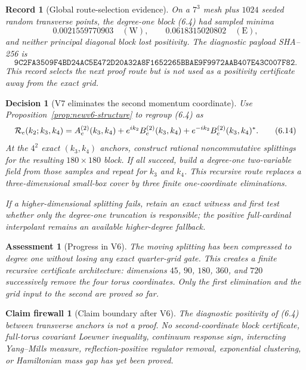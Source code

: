 \documentclass[11pt,oneside]{article}
\newtheorem{assessment}[theorem]{Assessment}
\newtheorem{firewall}[theorem]{Claim firewall}
\newtheorem{record}[theorem]{Record}
\newtheorem{decision}[theorem]{Decision}
\theoremstyle{definition}
\theoremstyle{remark}
\begin{document}
\begin{record}[Global route-selection evidence]
\label{rec:newv6-diagnostic}
On a \(7^3\) mesh plus \(1024\) seeded random transverse points, the
degree-one block (6.4) had sampled minima
\[
 0.0021559770903\quad(\mathrm W),\qquad
 0.0618315020802\quad(\mathrm E),                          \tag{6.12}
\]
and neither principal diagonal block lost positivity.  The
diagnostic payload SHA--256 is
\[
\texttt{9C2FA3509F4BD24AC5E472D20A32A8F1652265BBAE9F9972AAB407E43C007F82}.
                                                               \tag{6.13}
\]
This record selects the next proof route but is not used as a
positivity certificate away from the exact grid.
\end{record}

\begin{decision}[V7 eliminates the second momentum coordinate]
\label{dec:newv6-next}
Use Proposition~\ref{prop:newv6-structure} to regroup (6.4) as
\[
 {\cal R}_e(k_2;k_3,k_4)
 =A_e^{(2)}(k_3,k_4)
  +e^{ik_2}B_e^{(2)}(k_3,k_4)
  +e^{-ik_2}B_e^{(2)}(k_3,k_4)^*.                         \tag{6.14}
\]
At the \(4^2\) exact \((k_3,k_4)\) anchors, construct rational
noncommutative splittings for the resulting \(180\times180\) block.
If all succeed, build a degree-one two-variable field from those
samples and repeat for \(k_3\) and \(k_4\).  This recursive route
replaces a three-dimensional small-box cover by three finite
one-coordinate eliminations.

If a higher-dimensional splitting fails, retain an exact witness
and first test whether only the degree-one truncation is responsible;
the positive full-cardinal interpolant remains an available
higher-degree fallback.
\end{decision}

\begin{assessment}[Progress in V6]
\label{ass:newv6-progress}
The moving splitting has been compressed to degree one without
losing any exact quarter-grid gate.  This creates a finite recursive
certificate architecture: dimensions \(45\), \(90\), \(180\),
\(360\), and \(720\) successively remove the four torus coordinates.
Only the first elimination and the grid input to the second are
proved so far.
\end{assessment}

\begin{firewall}[Claim boundary after V6]
\label{fire:newv6-final}
The diagnostic positivity of (6.4) between transverse anchors is
not a proof.  No second-coordinate block certificate, full-torus
covariant Loewner inequality, continuum response sign, interacting
Yang--Mills measure, reflection-positive regulator removal,
exponential clustering, or Hamiltonian mass gap has yet been proved.
\end{firewall}
\end{document}
